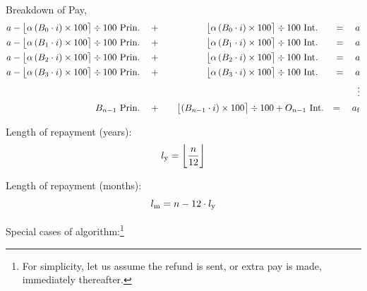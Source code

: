 \documentclass[12pt,letterpaper,oneside]{article}
\theoremstyle{remark} %
\begin{document}
	\newpage
	Breakdown of Pay,
	\begin{align*}
	a-\big\lfloor{\alpha\left(B_{0}\cdot i\right)\times 100}\big\rceil\div 100\mbox{\ Prin.}&\quad +\quad \qquad\quad\ \ \ \big\lfloor{\alpha\left(B_{0}\cdot i\right)\times 100}\big\rceil\div 100\mbox{\ Int.}&\, =\quad a&\\
	a-\big\lfloor{\alpha\left(B_{1}\cdot i\right)\times 100}\big\rceil\div 100\mbox{\ Prin.}&\quad +\quad \qquad\quad\ \ \ \big\lfloor{\alpha\left(B_{1}\cdot i\right)\times 100}\big\rceil\div 100\mbox{\ Int.}&\, =\quad a&\\
	a-\big\lfloor{\alpha\left(B_{2}\cdot i\right)\times 100}\big\rceil\div 100\mbox{\ Prin.}&\quad +\quad \qquad\quad\ \ \ \big\lfloor{\alpha\left(B_{2}\cdot i\right)\times 100}\big\rceil\div 100\mbox{\ Int.}&\, =\quad a&\\
	a-\big\lfloor{\alpha\left(B_{3}\cdot i\right)\times 100}\big\rceil\div 100\mbox{\ Prin.}&\quad +\quad \qquad\quad\ \ \ \big\lfloor{\alpha\left(B_{3}\cdot i\right)\times 100}\big\rceil\div 100\mbox{\ Int.}&\, =\quad a&\\
	&&\vdots&\\
	B_{n-1}\mbox{\ Prin.}&\quad +\quad\ \:\:\big\lfloor{\left(B_{n-1}\cdot i\right)\times 100}\big\rceil\div 100+O_{n-1}\mbox{\ Int.}& =\,\ \ \,a_{\rm{f}}&
	\end{align*}
	\normalsize

	\setlength\parindent{0pt} Length of repayment (years):
	$$l_{\rm{y}}=\bigg\lfloor{\frac{n}{12}}\bigg\rfloor$$

	\setlength\parindent{0pt} Length of repayment (months):
	$$l_{\rm{m}}=n-12\cdot l_{\rm{y}}$$

	\setlength\parindent{0pt} Special cases of algorithm:\footnote{For simplicity, let us assume the refund is sent, or extra pay is made, immediately thereafter.}
	\begin{figure}[h]
	\centering
	\begin{minipage}{1.0\linewidth}
	\begin{algorithm}[H]
	\end{algorithm}
	\end{minipage}
	\end{figure}
\end{document}
